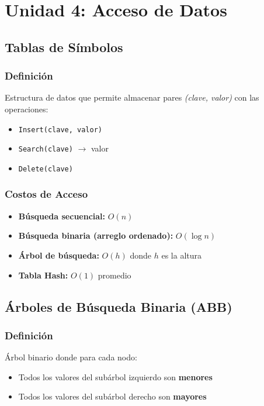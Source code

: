 \documentclass[12pt,a4paper]{article}
\begin{document}
\newpage

\section{Unidad 4: Acceso de Datos}

\subsection{Tablas de Símbolos}

\subsubsection{Definición}
Estructura de datos que permite almacenar pares \textit{(clave, valor)} con las operaciones:
\begin{itemize}
    \item \texttt{Insert(clave, valor)}
    \item \texttt{Search(clave)} $\rightarrow$ valor
    \item \texttt{Delete(clave)}
\end{itemize}

\subsubsection{Costos de Acceso}
\begin{itemize}
    \item \textbf{Búsqueda secuencial:} $O(n)$
    \item \textbf{Búsqueda binaria (arreglo ordenado):} $O(\log n)$
    \item \textbf{Árbol de búsqueda:} $O(h)$ donde $h$ es la altura
    \item \textbf{Tabla Hash:} $O(1)$ promedio
\end{itemize}

\subsection{Árboles de Búsqueda Binaria (ABB)}

\subsubsection{Definición}
Árbol binario donde para cada nodo:
\begin{itemize}
    \item Todos los valores del subárbol izquierdo son \textbf{menores}
    \item Todos los valores del subárbol derecho son \textbf{mayores}
\end{itemize}
\end{document}
